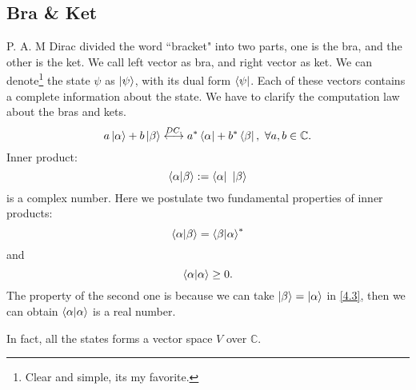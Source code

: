 \documentclass{article}
\theoremstyle{1}
\begin{document}
\subsection{Bra \& Ket}
\quad
P. A. M Dirac divided the word ``bracket" into two parts, one is the bra, and the other is the ket. We call left vector as bra, and right vector as ket. We can denote\footnote{Clear and simple, its my favorite.} the state $\psi$ as $\ket{\psi}$, with its dual form $\bra{\psi}$. Each of these vectors contains a complete information about the state. We have to clarify the computation law about the bras and kets.
\begin{equation}
   a\ket{\alpha}+b\ket{\beta} \overset{DC.}{\longleftrightarrow}a^*\bra{\alpha}+b^*\bra{\beta}, \ \forall a,b\in \mathbb{C}.
\end{equation}
Inner product:
\begin{equation}
    \braket{\alpha}{\beta}:=\bra{\alpha} \ \ket{\beta}
\end{equation}
is a complex number.
Here we postulate two fundamental properties of inner products:
\begin{equation}\label{4.3}
    \braket{\alpha}{\beta}=\braket{\beta}{\alpha}^*
\end{equation}
and 
\begin{equation}
    \braket{\alpha}{\alpha}\ge 0.
\end{equation}
\quad 
The property of the second one is because we can take $\ket{\beta}=\ket{\alpha}$ in \eqref{4.3}, then we can obtain $\braket{\alpha}{\alpha}$ is a real number.


In fact, all the states forms a vector space $V$ over $\mathbb{C}$.
\end{document}
